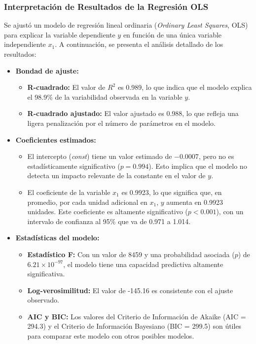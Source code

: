 \documentclass[a4paper,12pt]{article}
\begin{document}
        \subsubsection{Interpretación de Resultados de la Regresión OLS}

Se ajustó un modelo de regresión lineal ordinaria (\textit{Ordinary Least Squares}, OLS) para explicar la variable dependiente $y$ en función de una única variable independiente $x_1$. A continuación, se presenta el análisis detallado de los resultados:

\begin{itemize}
    \item \textbf{Bondad de ajuste:}
    \begin{itemize}
        \item \textbf{R-cuadrado:} El valor de $R^2$ es 0.989, lo que indica que el modelo explica el 98.9\% de la variabilidad observada en la variable $y$. 
        \item \textbf{R-cuadrado ajustado:} El valor ajustado es 0.988, lo que refleja una ligera penalización por el número de parámetros en el modelo.
    \end{itemize}

    \item \textbf{Coeficientes estimados:}
    \begin{itemize}
        \item El intercepto (\textit{const}) tiene un valor estimado de $-0.0007$, pero no es estadísticamente significativo ($p = 0.994$). Esto implica que el modelo no detecta un impacto relevante de la constante en el valor de $y$.
        \item El coeficiente de la variable $x_1$ es 0.9923, lo que significa que, en promedio, por cada unidad adicional en $x_1$, $y$ aumenta en 0.9923 unidades. Este coeficiente es altamente significativo ($p < 0.001$), con un intervalo de confianza al 95\% que va de 0.971 a 1.014.
    \end{itemize}

    \item \textbf{Estadísticas del modelo:}
    \begin{itemize}
        \item \textbf{Estadístico F:} Con un valor de 8459 y una probabilidad asociada ($p$) de $6.21 \times 10^{-97}$, el modelo tiene una capacidad predictiva altamente significativa.
        \item \textbf{Log-verosimilitud:} El valor de -145.16 es consistente con el ajuste observado.
        \item \textbf{AIC y BIC:} Los valores del Criterio de Información de Akaike (AIC = 294.3) y el Criterio de Información Bayesiano (BIC = 299.5) son útiles para comparar este modelo con otros posibles modelos.
    \end{itemize}


\end{itemize}
\end{document}
